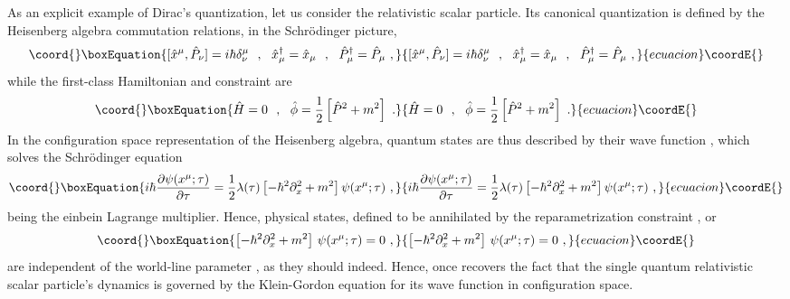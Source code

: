 \documentclass[a4paper,11pt]{article}
\begin{document}
As an explicit example of Dirac's quantization, let us consider the
relativistic scalar particle. Its canonical quantization is defined
by the Heisenberg algebra commutation relations, in the Schr\"odinger
picture,
\begin{equation}\coord{}\boxEquation{
[\hat{x}^\mu,\hat{P}_\nu]=i\hbar\delta^\mu_\nu\ \ ,\ \ 
{\hat{x}_\mu}^\dagger=\hat{x}_\mu\ \ ,\ \ 
{\hat{P}_\mu}^\dagger=\hat{P}_\mu\ ,
}{
[\hat{x}^\mu,\hat{P}_\nu]=i\hbar\delta^\mu_\nu\ \ ,\ \ 
{\hat{x}_\mu}^\dagger=\hat{x}_\mu\ \ ,\ \ 
{\hat{P}_\mu}^\dagger=\hat{P}_\mu\ ,
}{ecuacion}\coordE{}\end{equation}
while the first-class Hamiltonian and constraint are
\begin{equation}\coord{}\boxEquation{
\hat{H}=0\ \ ,\ \ \hat{\phi}=\frac{1}{2}\left[\hat{P}^2+m^2\right]\ .
}{
\hat{H}=0\ \ ,\ \ \hat{\phi}=\frac{1}{2}\left[\hat{P}^2+m^2\right]\ .
}{ecuacion}\coordE{}\end{equation}
In the configuration space representation of the Heisenberg algebra,
quantum states are thus described by their wave function \coordHE{},
which solves the Schr\"odinger equation
\begin{equation}\coord{}\boxEquation{i\hbar\frac{\partial\psi(x^\mu;\tau)}{\partial\tau}=
\frac{1}{2}\lambda(\tau)\left[-\hbar^2\partial^2_x+m^2\right]
\psi(x^\mu;\tau)\ ,
}{i\hbar\frac{\partial\psi(x^\mu;\tau)}{\partial\tau}=
\frac{1}{2}\lambda(\tau)\left[-\hbar^2\partial^2_x+m^2\right]
\psi(x^\mu;\tau)\ ,
}{ecuacion}\coordE{}\end{equation}
\myHighlight{$\lambda(\tau)$}\coordHE{} being the einbein Lagrange multiplier. Hence, physical states,
defined to be annihilated by the reparametrization constraint
\coordHE{}, or
\begin{equation}\coord{}\boxEquation{
\left[-\hbar^2\partial^2_x+m^2\right]\,\psi(x^\mu;\tau)=0\ ,
}{
\left[-\hbar^2\partial^2_x+m^2\right]\,\psi(x^\mu;\tau)=0\ ,
}{ecuacion}\coordE{}\end{equation}
are independent of the world-line parameter \myHighlight{$\tau$}\coordHE{}, as they should indeed.
Hence, once recovers the fact that the single quantum relativistic scalar
particle's dynamics is governed by the Klein-Gordon equation for its
wave function in configuration space.
\end{document}
